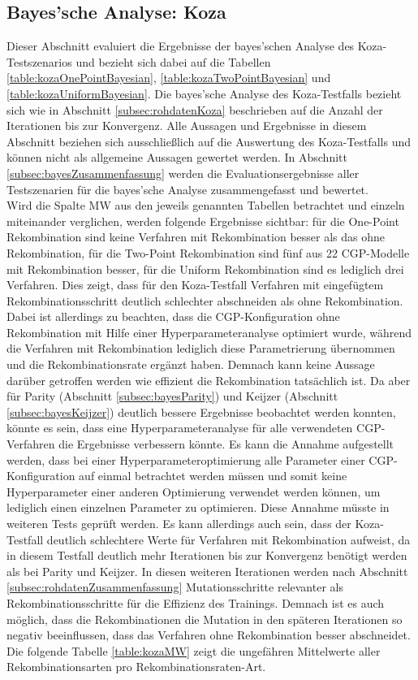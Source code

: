 \subsection{Bayes'sche Analyse: Koza}
\label{subsec:bayesKoza}

Dieser Abschnitt evaluiert die Ergebnisse der bayes'schen Analyse des Koza-Testszenarios und bezieht sich dabei auf die Tabellen \ref{table:kozaOnePointBayesian}, \ref{table:kozaTwoPointBayesian} und \ref{table:kozaUniformBayesian}.
Die bayes'sche Analyse des Koza-Testfalls bezieht sich wie in Abschnitt \ref{subsec:rohdatenKoza} beschrieben auf die Anzahl der Iterationen bis zur Konvergenz.
Alle Aussagen und Ergebnisse in diesem Abschnitt beziehen sich ausschließlich auf die Auswertung des Koza-Testfalls und können nicht als allgemeine Aussagen gewertet werden.
In Abschnitt \ref{subsec:bayesZusammenfassung} werden die Evaluationsergebnisse aller Testszenarien für die bayes'sche Analyse zusammengefasst und bewertet.\\
Wird die Spalte MW aus den jeweils genannten Tabellen betrachtet und einzeln miteinander verglichen, werden folgende Ergebnisse sichtbar: für die One-Point Rekombination sind keine Verfahren mit Rekombination besser als das ohne Rekombination, für die Two-Point Rekombination sind fünf aus 22 CGP-Modelle mit Rekombination besser, für die Uniform Rekombination sind es lediglich drei Verfahren.
Dies zeigt, dass für den Koza-Testfall Verfahren mit eingefügtem Rekombinationsschritt deutlich schlechter abschneiden als ohne Rekombination.
Dabei ist allerdings zu beachten, dass die CGP-Konfiguration ohne Rekombination mit Hilfe einer Hyperparameteranalyse optimiert wurde, während die Verfahren mit Rekombination lediglich diese Parametrierung übernommen und die Rekombinationsrate ergänzt haben.
Demnach kann keine Aussage darüber getroffen werden wie effizient die Rekombination tatsächlich ist.
Da aber für Parity (Abschnitt \ref{subsec:bayesParity}) und Keijzer (Abschnitt \ref{subsec:bayesKeijzer}) deutlich bessere Ergebnisse beobachtet werden konnten, könnte es sein, dass eine Hyperparameteranalyse für alle verwendeten CGP-Verfahren die Ergebnisse verbessern könnte.
Es kann die Annahme aufgestellt werden, dass bei einer Hyperparameteroptimierung alle Parameter einer CGP-Konfiguration auf einmal betrachtet werden müssen und somit keine Hyperparameter einer anderen Optimierung verwendet werden können, um lediglich einen einzelnen Parameter zu optimieren.
Diese Annahme müsste in weiteren Tests geprüft werden.
Es kann allerdings auch sein, dass der Koza-Testfall deutlich schlechtere Werte für Verfahren mit Rekombination aufweist, da in diesem Testfall deutlich mehr Iterationen bis zur Konvergenz benötigt werden als bei Parity und Keijzer.
In diesen weiteren Iterationen werden nach Abschnitt \ref{subsec:rohdatenZusammenfassung} Mutationsschritte relevanter als Rekombinationsschritte für die Effizienz des Trainings.
Demnach ist es auch möglich, dass die Rekombinationen die Mutation in den späteren Iterationen so negativ beeinflussen, dass das Verfahren ohne Rekombination besser abschneidet.\\
Die folgende Tabelle \ref{table:kozaMW} zeigt die ungefähren Mittelwerte aller Rekombinationsarten pro Rekombinationsraten-Art. 


